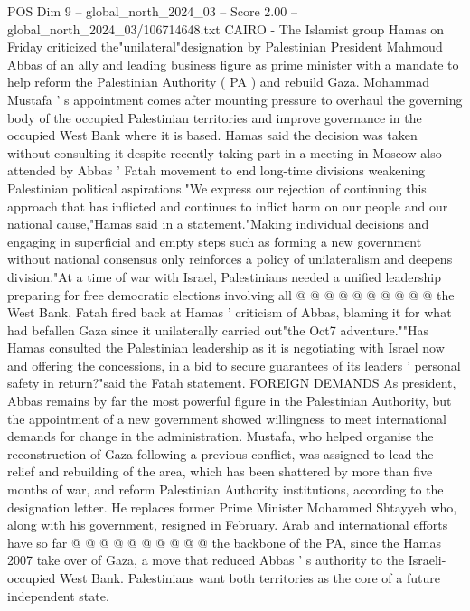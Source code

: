 \begin{textsample}{POS Dim 9 – global\_north\_2024\_03 – Score 2.00 – global\_north\_2024\_03/106714648.txt}  \label{ex:f9_pos_204}
CAIRO - The Islamist group Hamas on Friday criticized the"unilateral"designation by Palestinian President Mahmoud Abbas of an ally and leading business figure as prime minister with a mandate to help reform the Palestinian Authority ( PA ) and rebuild Gaza.
Mohammad Mustafa ' s appointment comes after mounting pressure to overhaul the governing body of the occupied Palestinian territories and improve governance in the occupied West Bank where it is based.
Hamas said the decision was taken without consulting it despite recently taking part in a meeting in Moscow also attended by Abbas ' Fatah movement to end long-time divisions weakening Palestinian political aspirations."We express our rejection of continuing this approach that has inflicted and continues to inflict harm on our people and our national cause,"Hamas said in a statement."Making individual decisions and engaging in superficial and empty steps such as forming a new government without national consensus only reinforces a policy of unilateralism and deepens division."At a time of war with Israel, Palestinians needed a unified leadership preparing for free democratic elections involving all @ @ @ @ @ @ @ @ @ @ the West Bank, Fatah fired back at Hamas ' criticism of Abbas, blaming it for what had befallen Gaza since it unilaterally carried out"the Oct7 adventure.""Has Hamas consulted the Palestinian leadership as it is negotiating with Israel now and offering the concessions, in a bid to secure guarantees of its leaders ' personal safety in return?"said the Fatah statement.
FOREIGN DEMANDS As president, Abbas remains by far the most powerful figure in the Palestinian Authority, but the appointment of a new government showed willingness to meet international demands for change in the administration.
Mustafa, who helped organise the reconstruction of Gaza following a previous conflict, was assigned to lead the relief and rebuilding of the area, which has been shattered by more than five months of war, and reform Palestinian Authority institutions, according to the designation letter.
He replaces former Prime Minister Mohammed Shtayyeh who, along with his government, resigned in February.
Arab and international efforts have so far @ @ @ @ @ @ @ @ @ @ the backbone of the PA, since the Hamas 2007 take over of Gaza, a move that reduced Abbas ' s authority to the Israeli-occupied West Bank.
Palestinians want both territories as the core of a future independent state.

\end{textsample}
